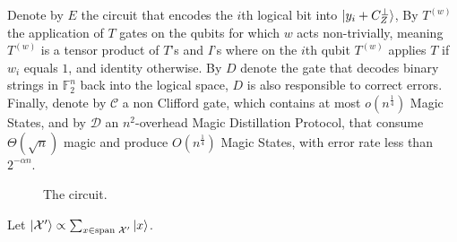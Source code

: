 \documentclass[manuscript,screen,review]{acmart}
\begin{document}
 Denote by $E$ the circuit that encodes the $i$th logical bit into $\ket{y_{i}+C_{Z}^{\perp}}$, By $T^{(w)}$ the application of $T$ gates on the qubits for which $w$ acts non-trivially, meaning $T^{(w)}$ is a tensor product of $T$'s and $I$'s where on the $i$th qubit $T^{(w)}$ applies $T$ if $w_{i}$ equals $1$, and identity otherwise. By $D$ denote the gate that decodes binary strings in $\mathbb{F}_{2}^{n}$ back into the logical space, $D$ is also responsible to correct errors.
 Finally, denote by $\mathcal{C}$ a non Clifford gate, which contains at most $o(n^{\frac{1}{4}})$ Magic States, and by $\mathcal{D}$ an $n^{2}$-overhead  Magic Distillation Protocol, that consume $\Theta(\sqrt{n})$ magic and produce $O(n^\frac{1}{4})$ Magic States, with error rate less than $2^{-\alpha n}$.     

\begin{figure}
  \label{fig:circ}
  \noindent %
  \scalebox{1.7}{ 
  
}
\caption{ The circuit.   }
\end{figure}

Let $\ket{\mathcal{X}^\prime} \propto \sum_{x \in \text{span } \mathcal{X}^\prime }{\ket{x}}$.
\end{document}
